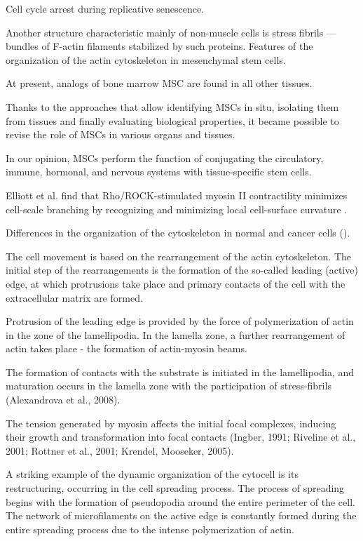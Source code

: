 \documentclass[alpha-refs]{wiley-article}
\begin{document}
Cell cycle arrest during replicative senescence.



Another structure characteristic mainly of non-muscle cells is stress fibrils — bundles of F-actin filaments stabilized by such proteins.
Features of the organization of the actin cytoskeleton in mesenchymal stem cells.

At present, analogs of bone marrow MSC are found in all other tissues.

Thanks to the approaches that allow identifying MSCs in situ, isolating them from tissues and finally evaluating biological properties, it became possible to revise the role of MSCs in various organs and tissues.

In our opinion, MSCs perform the function of conjugating the circulatory, immune, hormonal, and nervous systems with tissue-specific stem cells.


Elliott et al. find that Rho/ROCK-stimulated myosin II contractility minimizes cell-scale branching by recognizing and minimizing local cell-surface curvature \cite{elliott2015myosin}.

Differences in the organization of the cytoskeleton in normal and cancer cells (\cite{shutova2010normal}).

The cell movement is based on the rearrangement of the actin cytoskeleton. The initial step of the rearrangements is the formation of the so-called leading (active) edge, at which protrusions take place and primary contacts of the cell with the extracellular matrix are formed.

Protrusion of the leading edge is provided by the force of polymerization of actin in the zone of the lamellipodia. In the lamella zone, a further rearrangement of actin takes place - the formation of actin-myosin beams.

The formation of contacts with the substrate is initiated in the lamellipodia, and maturation occurs in the lamella zone with the participation of stress-fibrils (Alexandrova et al., 2008).


The tension generated by myosin affects the initial focal complexes, inducing their growth and transformation into focal contacts (Ingber, 1991; Riveline et al., 2001; Rottner et al., 2001; Krendel, Mooseker, 2005).

A striking example of the dynamic organization of the cytocell is its restructuring, occurring in the cell spreading process.
The process of spreading begins with the formation of pseudopodia around the entire perimeter of the cell.
The network of microfilaments on the active edge is constantly formed during the entire spreading process due to the intense polymerization of actin.
\end{document}

